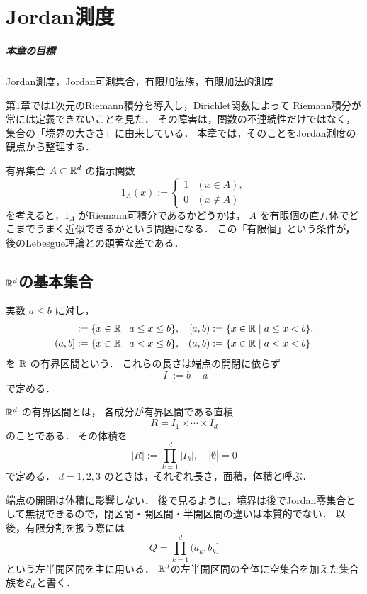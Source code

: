 \setcounter{chapter}{1}
\chapter{Jordan測度}

\paragraph{本章の目標}
Jordan測度，Jordan可測集合，有限加法族，有限加法的測度

第1章では1次元のRiemann積分を導入し，Dirichlet関数によって
Riemann積分が常には定義できないことを見た．
その障害は，関数の不連続性だけではなく，
集合の「境界の大きさ」に由来している．
本章では，そのことをJordan測度の観点から整理する．

有界集合 $A \subset \mathbb R^d$ の指示関数
\[
1_A(x) :=
\begin{cases}
1 & (x \in A),\\
0 & (x \notin A)
\end{cases}
\]
を考えると，$1_A$ がRiemann可積分であるかどうかは，
$A$ を有限個の直方体でどこまでうまく近似できるかという問題になる．
この「有限個」という条件が，
後のLebesgue理論との顕著な差である．

\section{\texorpdfstring{$\mathbb R^d$}{Rd}の基本集合}

\begin{definition}[区間と長さ]
実数 $a \le b$ に対し，
\begin{align*}
[a,b] &:= \{x \in \RR \mid a \le x \le b\}, &
[a,b) &:= \{x \in \RR \mid a \le x < b\},\\
(a,b] &:= \{x \in \RR \mid a < x \le b\}, &
(a,b) &:= \{x \in \RR \mid a < x < b\}
\end{align*}
を $\mathbb R$ の有界区間という．
これらの長さは端点の開閉に依らず
\[
|I| := b-a
\]
で定める．
\end{definition}

\begin{definition}[区間]
$\mathbb R^d$ の有界区間とは，
各成分が有界区間である直積
\[
R = I_1 \times \cdots \times I_d
\]
のことである．
その体積を
\[
|R| := \prod_{k=1}^d |I_k|,
\quad |\emptyset|=0
\]
で定める．
$d=1,2,3$ のときは，それぞれ長さ，面積，体積と呼ぶ．
\end{definition}

\begin{remark}
端点の開閉は体積に影響しない．
後で見るように，境界は後でJordan零集合として無視できるので，閉区間・開区間・半開区間の違いは本質的でない．
以後，有限分割を扱う際には
\[
Q = \prod_{k=1}^d (a_k,b_k]
\]
という左半開区間を主に用いる．
$\mathbb R^d$の左半開区間の全体に空集合を加えた集合族を$\mathcal E_d$と書く．
\end{remark}

